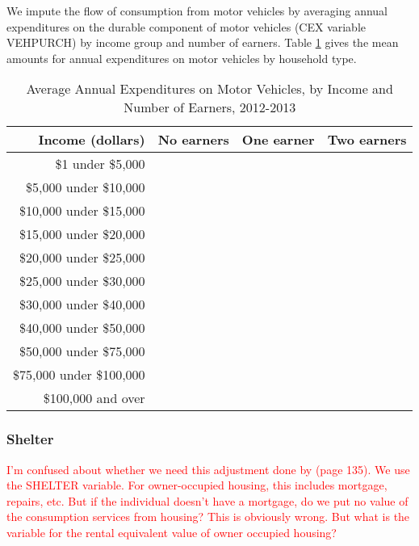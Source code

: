 \documentclass[article,11pt,letterpaper,fleqn]{article}
\theoremstyle{definition}
\numberwithin{equation}{section}
\newcommand{\cn}{\citeasnoun} %
\begin{document}
We impute the flow of consumption from motor vehicles by averaging annual expenditures on the durable component of motor vehicles (CEX variable VEHPURCH) by income group and number of earners.  Table \ref{tab:impute_motor} gives the mean amounts for annual expenditures on motor vehicles by household type.

\begin{table}[h!]
  \centering
  \caption{Average Annual Expenditures on Motor Vehicles, by Income and Number of Earners, 2012-2013}
    \begin{tabular}{rrrr}
    \hline
    \hline
    Income (dollars) & No earners & One earner & Two earners \\
    \hline
    \$1 under \$5,000 &       &       &  \\
    \$5,000 under \$10,000 &       &       &  \\
    \$10,000 under \$15,000 &       &       &  \\
    \$15,000 under \$20,000 &       &       &  \\
    \$20,000 under \$25,000 &       &       &  \\
    \$25,000 under \$30,000 &       &       &  \\
    \$30,000 under \$40,000 &       &       &  \\
    \$40,000 under \$50,000 &       &       &  \\
    \$50,000 under \$75,000 &       &       &  \\
    \$75,000 under \$100,000 &       &       &  \\
    \$100,000 and over &       &       &  \\
    \hline
    \hline
    \end{tabular}%
  \label{tab:impute_motor}%
\end{table}%



\subsubsection{Shelter}

\textcolor{red}{I'm confused about whether we need this adjustment done by \cn{FR1993} (page 135).  We use the SHELTER variable.  For owner-occupied housing, this includes mortgage, repairs, etc.  But if the individual doesn't have a mortgage, do we put no value of the consumption services from housing?  This is obviously wrong.  But what is the variable for the rental equivalent value of owner occupied housing?}
\end{document}
